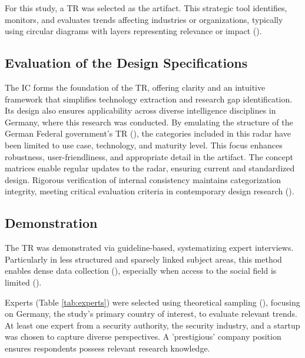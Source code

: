 \documentclass[10pt]{article}
\begin{document}
For this study, a TR was selected as the artifact. This strategic tool identifies, monitors, and evaluates trends affecting industries or organizations, typically using circular diagrams with layers representing relevance or impact (\cite{wulfmettbrenn2017}).

\subsection{Evaluation of the Design Specifications}
The IC forms the foundation of the TR, offering clarity and an intuitive framework that simplifies technology extraction and research gap identification. Its design also ensures applicability across diverse intelligence disciplines in Germany, where this research was conducted. By emulating the structure of the German Federal government's TR (\cite{Stich.2022}), the categories included in this radar have been limited to use case, technology, and maturity level. This focus enhances robustness, user-friendliness, and appropriate detail in the artifact. The concept matrices enable regular updates to the radar, ensuring current and standardized design. Rigorous verification of internal consistency maintains categorization integrity, meeting critical evaluation criteria in contemporary design research (\cite{Sonnenberg.2012}).


\subsection{Demonstration}
The TR was demonstrated via guideline-based, systematizing expert interviews. Particularly in less structured and sparsely linked subject areas, this method enables dense data collection (\cite{Meuser.1991}), especially when access to the social field is limited (\cite{Glaser.2009}).

Experts (Table \ref{tab:experts}) were selected using theoretical sampling (\cite{Glaser.1967}), focusing on Germany, the study's primary country of interest, to evaluate relevant trends. At least one expert from a security authority, the security industry, and a startup was chosen to capture diverse perspectives. A 'prestigious' company position ensures respondents possess relevant research knowledge.
\end{document}
